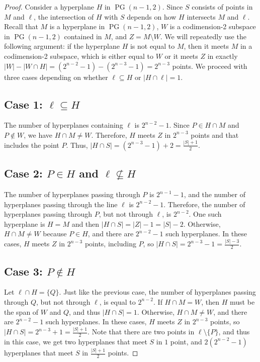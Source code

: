 \documentclass[a4paper,11pt]{amsproc}
\theoremstyle{plain}
\theoremstyle{definition}
\newcommand{\<}{\langle}
\renewcommand{\>}{\rangle} %
\DeclareMathOperator\pg{\mathrm{PG}}
\begin{document}
\begin{proof}
Consider a hyperplane $H$ in $\pg(n-1, 2)$. Since $S$ consists of points in $M$ and $\ell$, the intersection of $H$ with $S$ depends on how $H$ intersects $M$ and $\ell$. 
Recall that $M$ is a hyperplane in $\pg(n-1, 2)$,  $W$ is a codimension-2 subspace in $\pg(n - 1, 2)$ contained in $M$, and $Z=M \setminus W$.
We will repeatedly use the following argument: if the hyperplane $H$ is not equal to $M$, then it meets $M$ in a codimension-2 subspace, which is either equal to $W$ or it meets $Z$ in exactly $|W| - |W \cap H| = (2^{n - 2} - 1) - (2^{n - 3} - 1) = 2^{n - 3}$ points.
We proceed with three cases depending on whether $\ell \subseteq H$ or $|H \cap \ell| = 1$. 

\subsection*{Case 1: $\ell \subseteq H$}
The number of hyperplanes containing $\ell$ is $2^{n-2}-1$.
Since $P \in H \cap M$ and $P \notin W$, we have $H \cap M \neq W$. 
Therefore, $H$ meets $Z$ in $2^{n-3}$ points and that  includes the point $P$. Thus, $|H \cap S| = (2^{n - 3} - 1) + 2 = \frac{|S|+1}{2}$.

\subsection*{Case 2: $P \in H$ and $\ell \not\subseteq H$}
The number of hyperplanes passing through $P$ is $2^{n-1}-1$, and the number of hyperplanes passing through the line $\ell$ is $2^{n-2}-1$. Therefore, the number of hyperplanes passing through $P$, but not through $\ell$, is  $2^{n-2}$. 
One such hyperplane is $H = M$ and then $|H \cap S| = |Z| - 1 = |S| - 2$. Otherwise, $H \cap M \neq W$ because $P \in H$, and there are $2^{n-2}-1$ such hyperplanes. In these cases, $H$ meets $Z$ in $2^{n-3}$ points, including $P$, so $|H \cap S| = 2^{n - 3} - 1 = \frac{|S|-3}{2}$.

\subsection*{Case 3: $P \notin H$}
Let $\ell \cap H = \{Q\}$. 
Just like the previous case, the number of hyperplanes passing through $Q$, but not through $\ell$, is equal to $2^{n - 2}$. 
If $H \cap M = W$, then $H$ must be the span of $W$ and $Q$, and thus $|H \cap S| = 1$. 
Otherwise, $H \cap M \neq W$, and there are $2^{n-2}-1$ such hyperplanes. 
In these cases, $H$ meets $Z$ in $2^{n-3}$ points, so $|H \cap S| = 2^{n - 3}  + 1 = \frac{|S|+1}{2}$.
Note that there are two points in $\ell \setminus \{P\}$, and thus in this case, we get two hyperplanes that meet $S$ in $1$ point, and $2(2^{n- 2} - 1)$ hyperplanes that meet $S$ in $\frac{|S| + 1}{2}$ points. 
\end{proof}
\end{document}
